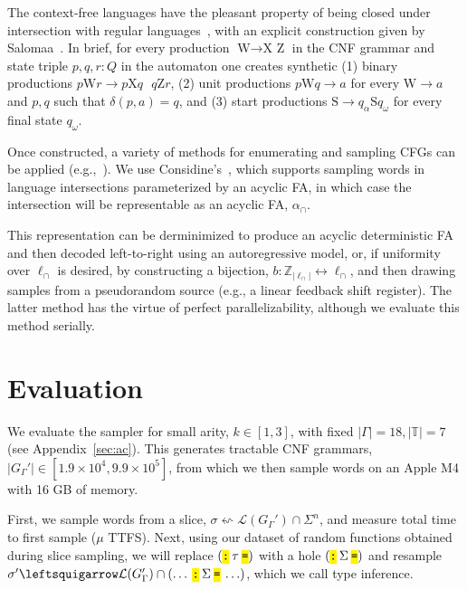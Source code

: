 \documentclass[sigplan,nonacm]{acmart}\settopmatter{printfolios=false,printccs=false,printacmref=false}
\begin{document}
  The context-free languages have the pleasant property of being closed under intersection with regular languages~\cite{bar1961formal}, with an explicit construction given by Salomaa~\cite{salomaa1973formal}. In brief, for every production $\text{W} \rightarrow \text{X Z}$ in the CNF grammar and state triple $p, q, r: Q$ in the automaton one creates synthetic (1) binary productions $p\text{W}r \rightarrow p\text{X}q\:\:\:q\text{Z}r$, (2) unit productions $p\text{W}q \rightarrow a$ for every $\text{W} \rightarrow a$ and $p, q$ such that $\delta(p, a) = q$, and (3) start productions $\text{S} \rightarrow q_\alpha\text{S}q_\omega$ for every final state $q_\omega$.

  Once constructed, a variety of methods for enumerating and sampling CFGs can be applied (e.g.,~\cite{considine2024tree, chiang2007hierarchical, piantadosi2023enumerate}). We use Considine's~\cite{considine2024tree}, which supports sampling words in language intersections parameterized by an acyclic FA, in which case the intersection will be representable as an acyclic FA, $\alpha_{\cap}$.

  This representation can be derminimized to produce an acyclic deterministic FA and then decoded left-to-right using an autoregressive model, or, if uniformity over $\ell_\cap$ is desired, by constructing a bijection, $b: \mathbb{Z}_{|\ell_\cap|}\leftrightarrow \ell_\cap$, and then drawing samples from a pseudorandom source (e.g., a linear feedback shift register). The latter method has the virtue of perfect parallelizability, although we evaluate this method serially.

  \section{Evaluation}

  We evaluate the sampler for small arity, $k\in [1,3]$, with fixed $|\Gamma|=18, |\mathbb{T}|=7$ (see Appendix~\ref{sec:ac}). This generates tractable CNF grammars, $|G_\Gamma'| \in [1.9\times 10^4, 9.9\times 10^5]$, from which we then sample words on an Apple M4 with 16 GB of memory.

  First, we sample words from a slice, $\sigma \leftsquigarrow \mathcal{L}(G_\Gamma') \cap \Sigma^n$, and measure total time to first sample ($\mu$ TTFS). Next, using our dataset of random functions obtained during slice sampling, we will replace $(\tok{:}\:\tau\:\tok{=})$ with a hole $(\tok{:}\: \Sigma\:\tok{=})$ and resample $\sigma' \leftsquigarrow \mathcal{L}(G_\Gamma') \cap (\ldots\:\tok{:}\:\Sigma\:\tok{=}\:\ldots)$, which we call type inference.\vspace{-0.2cm}
\end{document}
